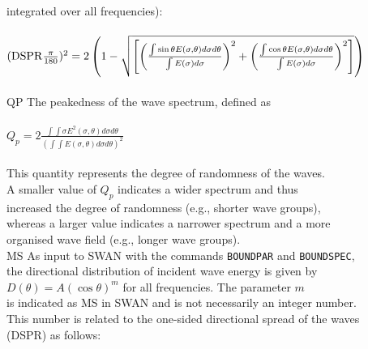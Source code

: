 \documentclass[12pt]{book}
\begin{document}
\begin{tabbing}
                        integrated over all frequencies):\\
                        \\
$({\rm DSPR} \frac{\pi}{180})^2 = 2\left( 1 - \sqrt{\left[ \left( \frac{\int\sin\theta E(\sigma,\theta)d\sigma d\theta}{\int E(\sigma)d\sigma} \right)^2 + \left( \frac{\int \cos\theta E(\sigma,\theta)d\sigma d\theta}{\int E(\sigma)d\sigma} \right)^2 \right]}\right)$ \\
                        \-\\
QP                   \> The peakedness of the wave spectrum, defined as\+\\
                        \\
$Q_p = 2 \frac{\int \int \sigma E^2(\sigma, \theta) d\sigma d\theta}{(\int \int E(\sigma, \theta) d\sigma d\theta)^2}$ \\
                        \\
                        This quantity represents the degree of randomness of the waves.\\
                        A smaller value of $Q_p$ indicates a wider spectrum and thus\\
                        increased the degree of randomness (e.g., shorter wave groups),\\
                        whereas a larger value indicates a narrower spectrum and a more\\
                        organised wave field (e.g., longer wave groups).\-\\
MS                   \> As input to SWAN with the commands {\tt BOUNDPAR} and {\tt BOUNDSPEC},\+\\
                        the directional distribution
                        of incident wave energy is given by\\
                        $D(\theta) = A(\cos\theta)^m$
                        for all frequencies. The parameter $m$\\
                        is indicated as MS in SWAN and is not necessarily an integer number.\\
                        This number is related to the
                        one-sided directional spread of the waves\\
                        (DSPR) as follows:\-\\
\end{tabbing}
\newpage
\end{document}
